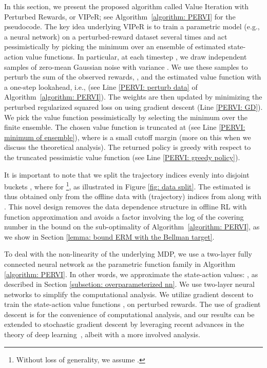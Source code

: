 \documentclass{article} \usepackage{iclr2023/iclr2023_conference,times}
\begin{document}
In this section, we present the proposed algorithm called Value Iteration with Perturbed Rewards, or VIPeR; see Algorithm~\ref{algorithm: PERVI} for the pseudocode. The key idea underlying VIPeR is to train a parametric model (e.g., a neural network) on a perturbed-reward dataset several times and act pessimistically by picking the minimum over an ensemble of estimated state-action value functions. 
In particular, at each timestep , we draw  independent samples of zero-mean Gaussian noise with variance . We use these samples to perturb the sum of the observed rewards, , and the estimated value function with a one-step lookahead, i.e.,   (see Line \ref{PERVI: perturb data} of Algorithm~\ref{algorithm: PERVI}). The weights  are then updated by minimizing the perturbed regularized squared loss on  using gradient descent (Line \ref{PERVI: GD}). We pick the value function pessimistically by selecting the minimum over the finite ensemble. The chosen value function is truncated at  (see Line \ref{PERVI: minimum of ensemble}), where  is a small cutoff margin (more on this when we discuss the theoretical analysis). The returned policy is greedy with respect to the truncated pessimistic value function (see Line \ref{PERVI: greedy policy}).

It is important to note that we split the trajectory indices  evenly into  disjoint buckets  , where  for \footnote{Without loss of generality, we assume .}, as illustrated in Figure \ref{fig: data split}. The estimated  is thus obtained only from the offline data with (trajectory) indices from  along with . This novel design removes the data dependence structure in offline RL with function approximation \citep{nguyentang2021sample} and avoids a factor involving the log of the covering number in the bound on the sub-optimality of Algorithm~\ref{algorithm: PERVI}, as we show in Section \ref{lemma: bound ERM with the Bellman target}. 























To deal with the non-linearity of the underlying MDP, we use a two-layer fully connected neural network as the parametric function family  in Algorithm \ref{algorithm: PERVI}. In other words, we approximate the state-action values: , as described in Section \ref{subsetion: overparameterized nn}. We use two-layer neural networks to simplify the computational analysis. We utilize gradient descent to train the state-action value functions , on perturbed rewards. The use of gradient descent is for the convenience of computational analysis, and our results can be extended to stochastic gradient descent by leveraging recent advances in the theory of deep learning~\citep{allen2019convergence,cao2019generalization}, albeit with a more involved analysis. 
\end{document}

